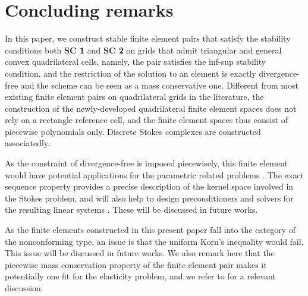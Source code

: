 \documentclass[12pt,showkeys]{amsart}
\begin{document}
\section{Concluding remarks}
\label{sec:con}
{
In this paper, we construct stable finite element pairs that satisfy the stability conditions both \textbf{SC 1} and \textbf{SC 2} on grids that admit triangular and general convex quadrilateral cells, namely, the pair satisfies the inf-sup stability condition, and the restriction of the solution to an element is exactly divergence-free and the scheme can be seen as a mass conservative one. Different from most existing finite element pairs on quadrilateral grids in the literature, the construction of the newly-developed quadrilateral finite element spaces does not rely on a rectangle reference cell, and the finite element spaces thus consist of piecewise polynomials only. Discrete Stokes complexes are constructed associatedly.
}

As the constraint of divergence-free is imposed piecewisely, this finite element would have potential applications for the parametric related problems \cite{Mardal.K;Tai.X;Winther.R2002,Xie.X;Xu.J;Xue.G2008}. The exact sequence property provides a precise description of the kernel space involved in the Stokes problem, and will also help to design preconditioners and solvers for the resulting linear systems \cite{Feng.C;Xu.J;Zhang.S2013,Hiptmair.R;Xu.J2007,Xie.X;Xu.J;Xue.G2008,Mardal.K;Schoberl.J;Winther.R2012}. These will be discussed in future works.

As the finite elements constructed in this present paper fall into the category of the nonconforming type, an issue is that the uniform Korn's inequality would fail\cite{Knoblock.P;Tobiska.L2005}. This issue will be discussed in future works. We also remark here that the piecewise mass conservation property of the finite element pair makes it potentially one fit for the elasticity problem, and we refer to \cite{Arnold.D1994} for a relevant discussion. 
\end{document}

